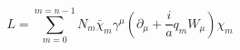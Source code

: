 \begin{equation}
L= \sum_{m=0} ^{m=n-1} N_m \bar\chi_m \gamma^\mu (\partial_\mu +
\frac{i}{a} q_m W_\mu)\chi_m
\end{equation}

